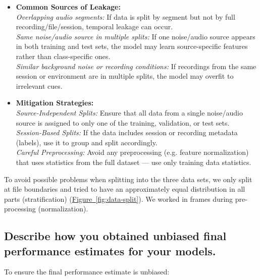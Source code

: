 \begin{itemize}
	\item {\bf Common Sources of Leakage: } \\
		{\it Overlapping audio segments: } If data is split by segment but not by full recording/file/session, temporal leakage can occur. \\
		{\it Same noise/audio source in multiple splits: } If one noise/audio source appears in both training and test sets, the model may learn source-specific features rather than class-specific ones. \\
		{\it Similar background noise or recording conditions: } If recordings from the same session or environment are in multiple splits, the model may overfit to irrelevant cues. 
	
	\item {\bf Mitigation Strategies: } \\
		{\it Source-Independent Splits:} Ensure that all data from a single noise/audio source is assigned to only one of the training, validation, or test sets. \\
		{\it Session-Based Splits:} If the data includes session or recording metadata (labels), use it to group and split accordingly. \\
		{\it Careful Preprocessing:} Avoid any preprocessing (e.g. feature normalization) that uses statistics from the full dataset — use only training data statistics. 
\end{itemize}


To avoid possible problems when splitting into the three data sets, 
we only split at file boundaries and tried to have an approximately equal distribution in all parts (stratification)  (\hyperref[fig:data-split]{Figure~\ref*{fig:data-split}}).
We worked in frames during pre-processing (normalization).




\subsection{Describe how you obtained unbiased final performance estimates for your models. }
\label{sec:Data Split:c}

To ensure the final performance estimate is unbiased:

